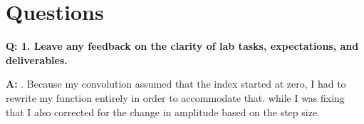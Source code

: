 \documentclass[12pt,a4paper]{article}
\newcommand{\Q}{\bigskip\bfseries Q: }
\newcommand{\A}{\par\textbf{A:} \normalfont}
\begin{document}
\section{Questions}\label{sec:res}

\Q 1. Leave any feedback on the clarity of lab tasks, expectations, and deliverables.
\A 1. Because my convolution assumed that the index started at zero, I had to rewrite my function entirely in order to accommodate that. while I was fixing that I also corrected for the change in amplitude based on the step size.




\end{document}
